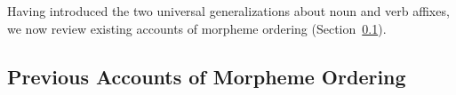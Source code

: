 \documentclass[11pt,letterpaper]{article}
\newcommand{\jd}[1]{\textcolor{Pink}{[jd: #1]}}
\begin{document}
Having introduced the two universal generalizations about noun and verb affixes, we now review existing accounts of morpheme ordering (Section~\ref{sec:previous}). 







\subsection{Previous Accounts of Morpheme Ordering}\label{sec:previous}
\end{document}
